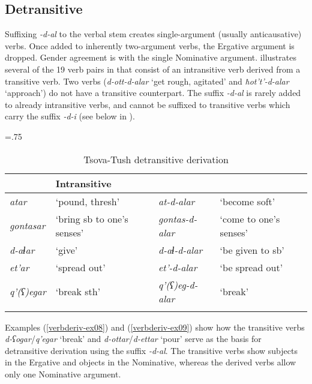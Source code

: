 \subsection{Detransitive} \label{intr}

Suffixing \textit{-d-al} to the verbal stem creates single-argument (usually anticausative) verbs. Once added to inherently two-argument verbs, the Ergative argument is dropped. Gender agreement is with the single Nominative argument.  illustrates several of the 19 verb pairs in \textcite{kadkad84} that consist of an intransitive verb derived from a transitive verb. Two verbs (\textit{d-ott-d-alar} `get rough, agitated' and \textit{ħot't'-d-alar} `approach') do not have a transitive counterpart. The suffix \textit{-d-al} is rarely added to already intransitive verbs, and cannot be suffixed to transitive verbs which carry the suffix \textit{-d-i} (see below in ).


\begin{table}
	\tabcolsep=.75\tabcolsep
	\begin{tabular}{llll}
		\lsptoprule
		\multicolumn{2}{l}{Transitive} & \multicolumn{2}{l}{Intransitive} \\
		\midrule
		\textit{atar} & `pound, thresh' & \textit{at-d-alar} & `become soft' \\
		\textit{gontasar} & `bring sb to one's senses' & \textit{gontas-d-alar} & `come to one's senses' \\
		\textit{d-aɬar} & `give' & \textit{d-aɬ-d-alar} & `be given to sb' \\
		\textit{et'ar} & `spread out' & \textit{et'-d-alar} & `be spread out' \\
		\textit{q'(ʕ)egar} & `break sth'  & \textit{q'(ʕ)eg-d-alar} & `break'  \\
		
		\lspbottomrule
	\end{tabular}
	\caption{Tsova-Tush detransitive derivation}
	\label{verbderiv-table2}
\end{table}

Examples (\ref{verbderiv-ex08}) and (\ref{verbderiv-ex09}) show how the transitive verbs \textit{d-ʕogar}/\textit{q'egar} `break' and \textit{d-ottar}/\textit{d-ettar} `pour' serve as the basis for detransitive derivation using the suffix \textit{-d-al}. The transitive verbs show subjects in the Ergative and objects in the Nominative, whereas the derived verbs allow only one Nominative argument.

